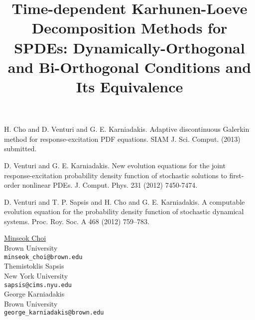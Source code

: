 \documentclass[article,A4,11pt]{llncs}%
\begin{document}

\begin{thebibliography}{10}
{\sc H. Cho and D. Venturi and G. E. Karniadakis}. {Adaptive discontinuous Galerkin method for response-excitation PDF equations}. SIAM J. Sci. Comput. (2013) submitted.

{\sc D. Venturi and G. E. Karniadakis}. {New evolution equations for the joint response-excitation probability density function of stochastic solutions to first-order nonlinear PDEs}. J. Comput. Phys. 231 (2012) 7450-7474.

{\sc D. Venturi and T. P. Sapsis and H. Cho and G. E. Karniadakis}. {A computable evolution equation for the probability density function of stochastic dynamical systems}. Proc. Roy. Soc. A 468 (2012) 759–783.
\end{thebibliography}

\title{Time-dependent Karhunen-Loeve Decomposition Methods for SPDEs: Dynamically-Orthogonal and Bi-Orthogonal Conditions and Its Equivalence}
 \author{} \institute{}
\maketitle
\begin{center}
{\large \underline{Minseok Choi}}\\
Brown University\\
{\tt minseok\_choi@brown.edu}
\\ \vspace{4mm}
{\large Themistoklis Sapsis}\\
New York University\\
{\tt sapsis@cims.nyu.edu}
\\ \vspace{4mm}
{\large George Karniadakis}\\
Brown University\\
{\tt george\_karniadakis@brown.edu}
\end{center}
\end{document}
